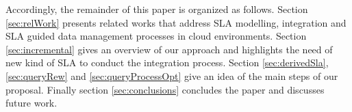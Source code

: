  
 
Accordingly, the remainder of this paper is organized as follows. Section \ref{sec:relWork} presents related works that address SLA modelling, integration and SLA guided data management processes in cloud environments. Section \ref{sec:incremental} gives an overview of our approach and highlights the need of new kind of SLA to conduct the integration process. Section \ref{sec:derivedSla}, \ref{sec:queryRew} and \ref{sec:queryProcessOpt} give an idea of the main steps of our proposal.  Finally section  \ref{sec:conclusions} concludes the paper and discusses future work.









 